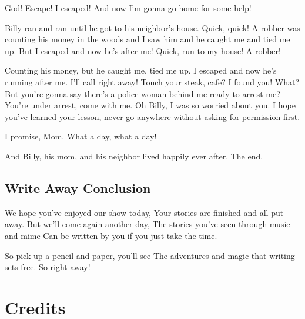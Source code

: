 God!
Escape!
I escaped!
And now I'm gonna go home for some help!


Billy ran and ran until he got to his neighbor's house.
Quick, quick!
A robber was counting his money in the woods and I saw him and he caught me and tied me up.
But I escaped and now he's after me!
Quick, run to my house!
A robber!

Counting his money, but he caught me, tied me up.
I escaped and now he's running after me.
I'll call right away!
Touch your steak, cafe?
I found you!
What?
But you're gonna say there's a police woman behind me ready to arrest me?
You're under arrest, come with me.
Oh Billy, I was so worried about you.
I hope you've learned your lesson, never go anywhere without asking for permission first.

I promise, Mom.
What a day, what a day!

And Billy, his mom, and his neighbor lived happily ever after.
The end.
\subsection{Write Away Conclusion}

We hope you've enjoyed our show today,
Your stories are finished and all put away.
But we'll come again another day,
The stories you've seen through music and mime
Can be written by you if you just take the time.

So pick up a pencil and paper, you'll see
The adventures and magic that writing sets free.
So right away!

\section{Credits}